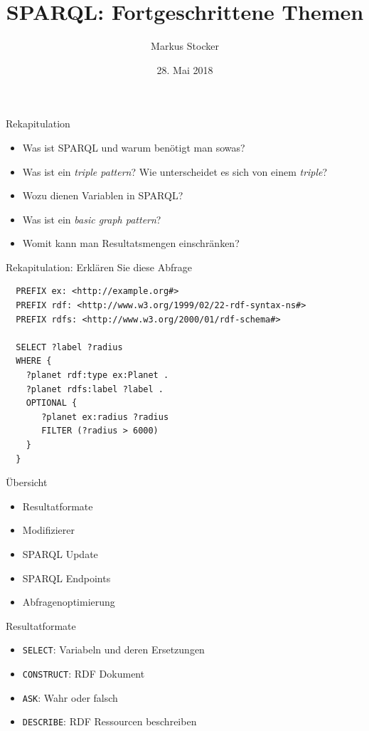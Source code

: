 \documentclass{beamer}
\title{SPARQL: Fortgeschrittene Themen}
\author{Markus Stocker}
\date{28. Mai 2018}
\begin{document}
\maketitle

\begin{frame}{Rekapitulation}
	
	\begin{itemize}
		\item Was ist SPARQL und warum benötigt man sowas?
		\item Was ist ein \emph{triple pattern}? Wie unterscheidet es sich von einem \emph{triple}?
		\item Wozu dienen Variablen in SPARQL?
		\item Was ist ein \emph{basic graph pattern}?
		\item Womit kann man Resultatsmengen einschränken?
	\end{itemize}
	
\end{frame}

\begin{frame}[fragile]{Rekapitulation: Erklären Sie diese Abfrage}
	
	\small
	\begin{lstlisting}
  PREFIX ex: <http://example.org#> 
  PREFIX rdf: <http://www.w3.org/1999/02/22-rdf-syntax-ns#>
  PREFIX rdfs: <http://www.w3.org/2000/01/rdf-schema#>
	
  SELECT ?label ?radius
  WHERE {
    ?planet rdf:type ex:Planet .
    ?planet rdfs:label ?label .
    OPTIONAL { 
       ?planet ex:radius ?radius 
       FILTER (?radius > 6000)
    }
  }
	\end{lstlisting}
	
\end{frame}

\begin{frame}{Übersicht}
	
	\begin{itemize}
		\item Resultatformate
		\item Modifizierer
		\item SPARQL Update
		\item SPARQL Endpoints
		\item Abfragenoptimierung
	\end{itemize}
	
\end{frame}

\begin{frame}{Resultatformate}
	
	\begin{itemize}
		\item \texttt{SELECT}: Variabeln und deren Ersetzungen
		\item \texttt{CONSTRUCT}: RDF Dokument
		\item \texttt{ASK}: Wahr oder falsch
		\item \texttt{DESCRIBE}: RDF Ressourcen beschreiben
	\end{itemize}
	
\end{frame}
\end{document}
